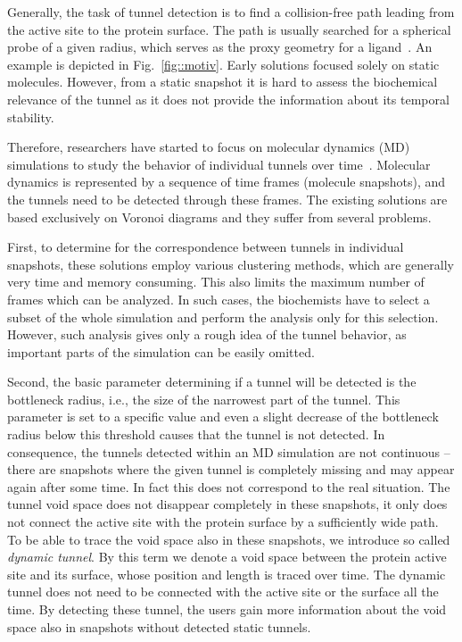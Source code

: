\documentclass[usletter, 10pt, conference]{svjour3}      %
\begin{document}
Generally, the task of tunnel detection is to find a collision-free path leading from the active site to the protein surface. 
The path is usually searched for a spherical probe of a given radius, which serves as the proxy geometry for a ligand~\cite{caver3,sehnal2013mole,kozlikova2014ca}.
An example is depicted in Fig.~\ref{fig::motiv}.
Early solutions focused solely on static molecules. 
However, from a static snapshot it is hard to assess the biochemical relevance of the tunnel as it does not provide the information about its temporal stability. 

Therefore, researchers have started to focus on molecular dynamics (MD) simulations to study the behavior of individual tunnels over time~\cite{yaffe2008,caver3,sehnal2013mole,jurcik2016accelerated}.
Molecular dynamics is represented by a sequence of time frames (molecule snapshots), and the tunnels need to be detected through these frames.
The existing solutions are based exclusively on Voronoi diagrams and they suffer from several problems.

First, to determine for the correspondence between tunnels in individual snapshots, these solutions employ various clustering methods, which are generally very time and memory consuming.
This also limits the maximum number of frames which can be analyzed.
In such cases, the biochemists have to select a subset of the whole simulation and perform the analysis only for this selection.
However, such analysis gives only a rough idea of the tunnel behavior, as important parts of the simulation can be easily omitted.

Second, the basic parameter determining if a tunnel will be detected is the bottleneck radius, i.e., the size of the narrowest part of the tunnel. 
This parameter is set to a specific value and even a slight decrease of the bottleneck radius below this threshold causes that the tunnel is not detected.
In consequence, the tunnels detected within an MD simulation are not continuous -- there are snapshots where the given tunnel is completely missing and may appear again after some time.
In fact this does not correspond to the real situation. 
The tunnel void space does not disappear completely in these snapshots, it only does not connect the active site with the protein surface by a sufficiently wide path.
To be able to trace the void space also in these snapshots, we introduce so called {\it dynamic tunnel}.
By this term we denote a void space between the protein active site and its surface, whose position and length is traced over time.
The dynamic tunnel does not need to be connected with the active site or the surface all the time.
By detecting these tunnel, the users gain more information about the void space also in snapshots without detected static tunnels.
\end{document}
